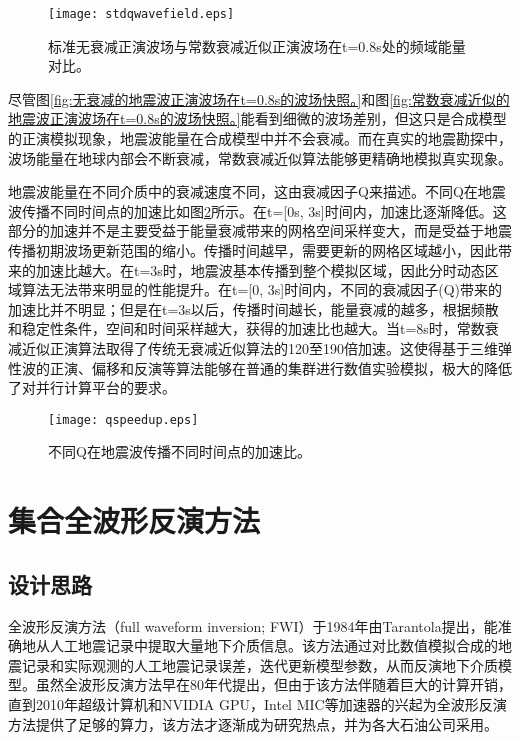 \begin{figure}[ht]
\centering
\texttt{[image: stdqwavefield.eps]}
\caption{标准无衰减正演波场与常数衰减近似正演波场在t=0.8s处的频域能量对比。}
\label{fig:stdqwavefield}
\end{figure}

尽管图\ref{fig:无衰减的地震波正演波场在t=0.8s的波场快照。}和图\ref{fig:常数衰减近似的地震波正演波场在t=0.8s的波场快照。}能看到细微的波场差别，但这只是合成模型的正演模拟现象，地震波能量在合成模型中并不会衰减。而在真实的地震勘探中，波场能量在地球内部会不断衰减，常数衰减近似算法能够更精确地模拟真实现象。

地震波能量在不同介质中的衰减速度不同，这由衰减因子Q来描述。不同Q在地震波传播不同时间点的加速比如图\ref{fig:diffqspeedup}所示。在t=[0s, 3s]时间内，加速比逐渐降低。这部分的加速并不是主要受益于能量衰减带来的网格空间采样变大，而是受益于地震传播初期波场更新范围的缩小。传播时间越早，需要更新的网格区域越小，因此带来的加速比越大。在t=3s时，地震波基本传播到整个模拟区域，因此分时动态区域算法无法带来明显的性能提升。在t=[0, 3s]时间内，不同的衰减因子(Q)带来的加速比并不明显；但是在t=3s以后，传播时间越长，能量衰减的越多，根据频散和稳定性条件，空间和时间采样越大，获得的加速比也越大。当t=8s时，常数衰减近似正演算法取得了传统无衰减近似算法的120至190倍加速。这使得基于三维弹性波的正演、偏移和反演等算法能够在普通的集群进行数值实验模拟，极大的降低了对并行计算平台的要求。

\begin{figure}[ht]
\centering
\texttt{[image: qspeedup.eps]}
\caption{不同Q在地震波传播不同时间点的加速比。}
\label{fig:diffqspeedup}
\end{figure}


\section{集合全波形反演方法}

\subsection{设计思路}
全波形反演方法（full waveform inversion; FWI）于1984年由Tarantola提出，能准确地从人工地震记录中提取大量地下介质信息\cite{tarantola1984inversion,plessix2012full,brossier2009seismic}。该方法通过对比数值模拟合成的地震记录和实际观测的人工地震记录误差，迭代更新模型参数，从而反演地下介质模型\cite{yushu}。虽然全波形反演方法早在80年代提出，但由于该方法伴随着巨大的计算开销，直到2010年超级计算机和NVIDIA GPU，Intel MIC等加速器的兴起为全波形反演方法提供了足够的算力，该方法才逐渐成为研究热点，并为各大石油公司采用。

